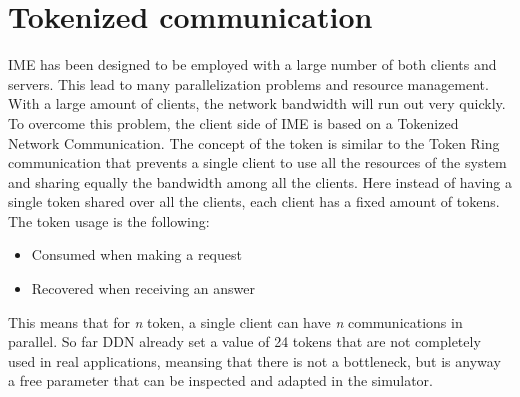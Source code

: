 \section{Tokenized communication}
IME has been designed to be employed with a large number of both clients and
servers. This lead to many parallelization problems and resource management.
With a large amount of clients, the network bandwidth will run out very quickly.
To overcome this problem, the client side of IME is based on a Tokenized Network
Communication. The concept of the token is similar to the Token Ring
communication \cite{token-ring} that prevents a single client to use all the
resources of the system and sharing equally the bandwidth among all the
clients.  Here instead of having a single token shared over all the clients,
each client has a fixed amount of tokens.\\
The token usage is the following:
\begin{itemize}
    \item Consumed when making a request
    \item Recovered when receiving an answer
\end{itemize}
This means that for \textit{n} token, a single client can have \textit{n}
communications in parallel.  So far DDN already set a value of 24 tokens that
are not completely used in real applications, meansing that there is not a
bottleneck, but is anyway a free parameter that can be inspected and adapted in
the simulator.


